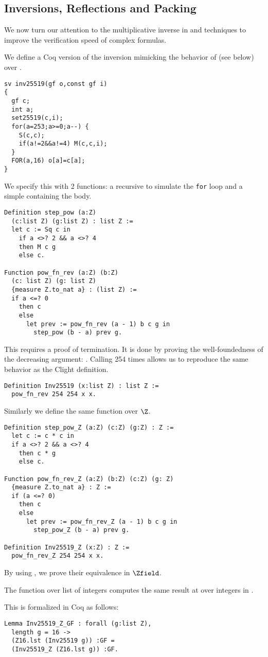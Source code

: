 \subsection{Inversions, Reflections and Packing}
\label{subsec:inversions-reflections}

We now turn our attention to the multiplicative inverse in \Zfield and techniques
to improve the verification speed of complex formulas.

We define a Coq version of the inversion mimicking
the behavior of  (see below) over .
\begin{lstlisting}[language=Ctweetnacl]
sv inv25519(gf o,const gf i)
{
  gf c;
  int a;
  set25519(c,i);
  for(a=253;a>=0;a--) {
    S(c,c);
    if(a!=2&&a!=4) M(c,c,i);
  }
  FOR(a,16) o[a]=c[a];
}
\end{lstlisting}
We specify this with 2 functions: a recursive 
to simulate the \texttt{for} loop and a simple  containing the body.
\begin{lstlisting}[language=Coq]
Definition step_pow (a:Z)
  (c:list Z) (g:list Z) : list Z :=
  let c := Sq c in
    if a <>? 2 && a <>? 4
    then M c g
    else c.

Function pow_fn_rev (a:Z) (b:Z)
  (c: list Z) (g: list Z)
  {measure Z.to_nat a} : (list Z) :=
  if a <=? 0
    then c
    else
      let prev := pow_fn_rev (a - 1) b c g in
        step_pow (b - a) prev g.
\end{lstlisting}
This  requires a proof of termination. It is done by proving the
well-foundedness of the decreasing argument: . Calling
 254 times allows us to reproduce the same behavior as the Clight definition.
\begin{lstlisting}[language=Coq]
Definition Inv25519 (x:list Z) : list Z :=
  pow_fn_rev 254 254 x x.
\end{lstlisting}
Similarly we define the same function over $\Z$.
\begin{lstlisting}[language=Coq]
Definition step_pow_Z (a:Z) (c:Z) (g:Z) : Z :=
  let c := c * c in
  if a <>? 2 && a <>? 4
    then c * g
    else c.

Function pow_fn_rev_Z (a:Z) (b:Z) (c:Z) (g: Z)
  {measure Z.to_nat a} : Z :=
  if (a <=? 0)
    then c
    else
      let prev := pow_fn_rev_Z (a - 1) b c g in
        step_pow_Z (b - a) prev g.

Definition Inv25519_Z (x:Z) : Z :=
  pow_fn_rev_Z 254 254 x x.
\end{lstlisting}
By using , we prove their equivalence in $\Zfield$.
\begin{lemma}
\label{lemma:Inv_equivalence}
The function  over list of integers computes the same
result at  over integers in \Zfield.
\end{lemma}
This is formalized in Coq as follows:
\begin{lstlisting}[language=Coq]
Lemma Inv25519_Z_GF : forall (g:list Z),
  length g = 16 ->
  (Z16.lst (Inv25519 g)) :GF =
  (Inv25519_Z (Z16.lst g)) :GF.
\end{lstlisting}

